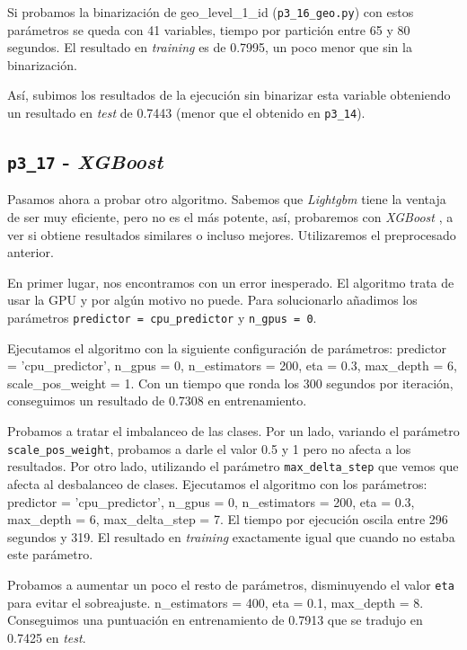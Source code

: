 \documentclass[a4paper, 20pt]{article}
\begin{document}
Si probamos la binarización de geo\_level\_1\_id (\texttt{p3\_16\_geo.py}) con estos parámetros se queda con 41 variables, tiempo por partición entre 65 y 80 segundos. El resultado en \textit{training} es de 0.7995, un poco menor que sin la binarización.

Así, subimos los resultados de la ejecución sin binarizar esta variable obteniendo un resultado en \textit{test} de 0.7443 (menor que el obtenido en \texttt{p3\_14}). 

\subsection{\texttt{p3\_17} - \textit{XGBoost}}

Pasamos ahora a probar otro algoritmo. Sabemos que \textit{Lightgbm} tiene la ventaja de ser muy eficiente, pero no es el más potente, así, probaremos con \textit{XGBoost} \cite{noauthor_xgboost_nodate}, a ver si obtiene resultados similares o incluso mejores. Utilizaremos el preprocesado anterior.

En primer lugar, nos encontramos con un error inesperado. El algoritmo trata de usar la GPU y por algún motivo no puede. Para solucionarlo añadimos los parámetros \texttt{predictor = cpu\_predictor} y \texttt{n\_gpus = 0}.

Ejecutamos el algoritmo con la siguiente configuración de parámetros: {\ttfamily predictor = 'cpu\_predictor', n\_gpus = 0, n\_estimators = 200, eta = 0.3, max\_depth = 6, scale\_pos\_weight = 1}. Con un tiempo que ronda los 300 segundos por iteración, conseguimos un resultado de 0.7308 en entrenamiento.

Probamos a tratar el imbalanceo de las clases. Por un lado, variando el parámetro \texttt{scale\_pos\_weight}, probamos a darle el valor 0.5 y 1 pero no afecta a los resultados. Por otro lado, utilizando el parámetro \texttt{max\_delta\_step} que vemos que afecta al desbalanceo de clases. Ejecutamos el algoritmo con los parámetros: {\ttfamily predictor = 'cpu\_predictor', n\_gpus = 0, n\_estimators = 200, eta = 0.3, max\_depth = 6, max\_delta\_step = 7}. El tiempo por ejecución oscila entre 296 segundos y 319. El resultado en \textit{training} exactamente igual que cuando no estaba este parámetro.

Probamos a aumentar un poco el resto de parámetros, disminuyendo el valor \texttt{eta} para evitar el sobreajuste. {\ttfamily n\_estimators = 400, eta = 0.1, max\_depth = 8}. Conseguimos una puntuación en entrenamiento de 0.7913 que se tradujo en 0.7425 en \textit{test}.
\end{document}
